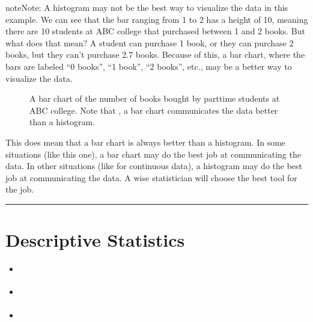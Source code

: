 \documentclass[letterpaper,10pt,english]{jupyterBook}
\begin{document}
\begin{sphinxadmonition}{note}{Note:}
\sphinxAtStartPar
A histogram may not be the best way to visualize the data in this example. We can see that the bar ranging from 1 to 2 has a height of 10, meaning there are 10 students at ABC college that purchased between 1 and 2 books. But what does that mean? A student can purchase 1 book, or they can purchase 2 books, but they can’t purchase 2.7 books. Because of this, a bar chart, where the bars are labeled “0 books”, “1 book”, “2 books”, etc., may be a better way to visualize the data.

\begin{figure}[H]
\centering
\capstart

\noindent{}
\caption{A bar chart of the number of books bought by part\sphinxhyphen{}time students at ABC college. Note that , a bar chart communicates the data better than a histogram.}\label{\detokenize{Ch1 Sampling and Data/1.4 Tables and Charts:books-bar}}\end{figure}

\sphinxAtStartPar
This does  mean that a bar chart is always better than a histogram. In some situations (like this one), a bar chart may do the best job at communicating the data. In other situations (like for continuous data), a histogram may do the best job at communicating the data. A wise statistician will choose the best tool for the job.
\end{sphinxadmonition}


\bigskip\hrule\bigskip


\sphinxstepscope


\chapter{Descriptive Statistics}
\label{\detokenize{Ch2 Descriptive Statistics/2.0 Descriptive Statistics:descriptive-statistics}}\label{\detokenize{Ch2 Descriptive Statistics/2.0 Descriptive Statistics::doc}}\begin{itemize}
\item {} 
\sphinxAtStartPar
{\hyperref[\detokenize{Ch2 Descriptive Statistics/2.1 Measures of Position::doc}]{}}

\item {} 
\sphinxAtStartPar
{\hyperref[\detokenize{Ch2 Descriptive Statistics/2.2 Measures of Central Tendency::doc}]{}}

\item {} 
\sphinxAtStartPar
{\hyperref[\detokenize{Ch2 Descriptive Statistics/2.3 Measures of Dispersion::doc}]{}}

\end{itemize}
\end{document}
